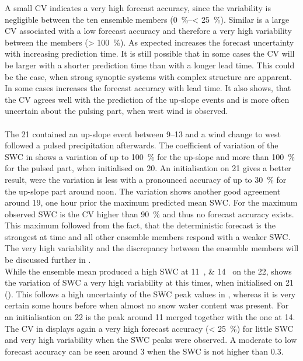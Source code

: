 %
A small CV indicates a very high forecast accuracy, since the variability is negligible between the ten ensemble members (\SIrange{0}{< 25}{\percent}). Similar is a large CV associated with a low forecast accuracy and therefore a very high variability between the members (\SI{> 100}{\percent}). As expected increases the forecast uncertainty with increasing prediction time. It is still possible that in some cases the CV will be larger with a shorter prediction time than with a longer lead time. This could be the case, when strong synoptic systems with complex structure are apparent.
\\
In some cases increases the forecast accuracy with lead time. It also shows, that the CV agrees well with the prediction of the up-slope events and is more often uncertain about the pulsing part, when west wind is observed. 
\\
\\
The \SI{21}{\dec} contained an up-slope event between \SIrange{9}{13}{\UTC} and a wind change to west followed a pulsed precipitation afterwards. The coefficient of variation of the SWC in  shows a variation of up to \SI{100}{\percent} for the up-slope and more than \SI{100}{\percent} for the pulsed part, when initialised on \SI{20}{\dec}. An initialisation on \SI{21}{\dec} gives a better result, were the variation is less with a pronounced accuracy of up to \SI{30}{\percent} for the up-slope part around noon. 
The variation shows another good agreement around \SI{19}{\UTC}, one hour prior the maximum predicted mean SWC. For the maximum observed SWC is the CV higher than \SI{90}{\percent} and thus no forecast accuracy exists. This maximum followed from the fact, that the deterministic forecast is the strongest at time and all other ensemble members respond with a weaker SWC. The very high variability and the discrepancy between the ensemble members will be discussed further in .
\\
While the ensemble mean produced a high SWC at \SIlist{11;14}{\UTC} on the \SI{22}{\dec}, shows the variation of SWC a very high variability at this times, when initialised on \SI{21}{\dec} (). This follows a high uncertainty of the SWC peak values in , whereas it is very certain some hours before when almost no snow water content was present. 
For an initialisation on \SI{22}{\dec} is the peak around \SI{11}{\UTC} merged together with the one at \SI{14}{\UTC}. The CV in  displays again a very high forecast accuracy (\SI{< 25}{\percent}) for little SWC and very high variability when the SWC peaks were observed. A moderate to low forecast accuracy can be seen around \SI{3}{\UTC} when the SWC is not higher than \SI{0.3}{\SWC}. 

